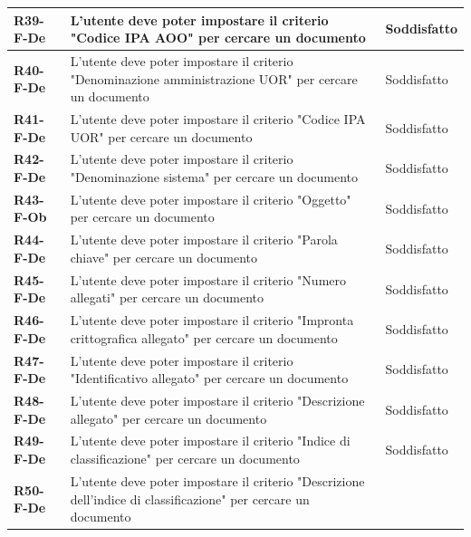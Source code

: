 \documentclass[a4paper,12pt]{article}
\begin{document}
{{\begin{longtable}{|>{\centering\arraybackslash}m{}|>{\centering\arraybackslash}m{}|>{\centering\arraybackslash}m{}|}
                \hline
                \textbf{R39-F-De} & L'utente deve poter impostare il criterio "Codice IPA AOO" per cercare un documento & 
                Soddisfatto \\
                \hline
                \textbf{R40-F-De} & L'utente deve poter impostare il criterio "Denominazione amministrazione UOR" per cercare un documento & 
                Soddisfatto \\
                \hline
                \textbf{R41-F-De} & L'utente deve poter impostare il criterio "Codice IPA UOR" per cercare un documento & 
                Soddisfatto \\
                \hline
                \textbf{R42-F-De} & L'utente deve poter impostare il criterio "Denominazione sistema" per cercare un documento & 
                Soddisfatto \\ 
                \hline
                \textbf{R43-F-Ob} & L'utente deve poter impostare il criterio "Oggetto" per cercare un documento & 
                Soddisfatto \\ 
                \hline
                \textbf{R44-F-De} & L'utente deve poter impostare il criterio "Parola chiave" per cercare un documento & 
                Soddisfatto \\ 
                \hline
                \textbf{R45-F-De} & L'utente deve poter impostare il criterio "Numero allegati" per cercare un documento & 
                Soddisfatto \\ 
                \hline
                \textbf{R46-F-De} & L'utente deve poter impostare il criterio "Impronta crittografica allegato" per cercare un documento & 
                Soddisfatto \\ 
                \hline
                \textbf{R47-F-De} & L'utente deve poter impostare il criterio "Identificativo allegato" per cercare un documento & 
                Soddisfatto \\ 
                \hline
                \textbf{R48-F-De} & L'utente deve poter impostare il criterio "Descrizione allegato" per cercare un documento & 
                Soddisfatto \\ 
                \hline
                \textbf{R49-F-De} & L'utente deve poter impostare il criterio "Indice di classificazione" per cercare un documento & 
                Soddisfatto \\ 
                \hline
                \textbf{R50-F-De} & L'utente deve poter impostare il criterio "Descrizione dell'indice di classificazione" per cercare un documento & 

\end{longtable}}}
\end{document}
